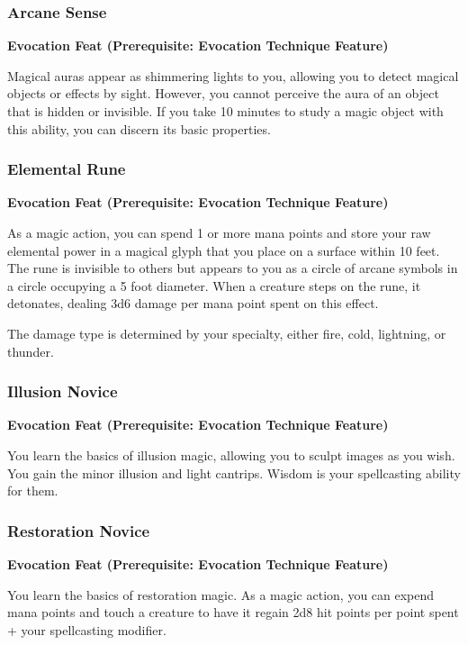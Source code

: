 \documentclass[12pt,letterpaper,twocolumn,openany,nodeprecatedcode,bg=none]{dndbook}
\begin{document}
\subsubsection{Arcane Sense}\label{arcane-sense}

\textbf{Evocation Feat (Prerequisite: Evocation Technique Feature)}

Magical auras appear as shimmering lights to you, allowing you to detect
magical objects or effects by sight. However, you cannot perceive the
aura of an object that is hidden or invisible. If you take 10 minutes to
study a magic object with this ability, you can discern its basic
properties.

\subsubsection{Elemental Rune}\label{elemental-rune}

\textbf{Evocation Feat (Prerequisite: Evocation Technique Feature)}

As a magic action, you can spend 1 or more mana points and store your
raw elemental power in a magical glyph that you place on a surface
within 10 feet. The rune is invisible to others but appears to you as a
circle of arcane symbols in a circle occupying a 5 foot diameter. When a
creature steps on the rune, it detonates, dealing 3d6 damage per mana
point spent on this effect.

The damage type is determined by your specialty, either fire, cold,
lightning, or thunder.

\subsubsection{Illusion Novice}\label{illusion-novice}

\textbf{Evocation Feat (Prerequisite: Evocation Technique Feature)}

You learn the basics of illusion magic, allowing you to sculpt images as
you wish. You gain the minor illusion and light cantrips. Wisdom is your
spellcasting ability for them.

\subsubsection{Restoration Novice}\label{restoration-novice}

\textbf{Evocation Feat (Prerequisite: Evocation Technique Feature)}

You learn the basics of restoration magic. As a magic action, you can
expend mana points and touch a creature to have it regain 2d8 hit points
per point spent + your spellcasting modifier.
\end{document}
